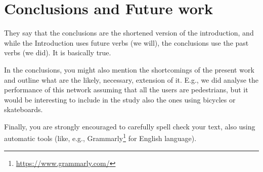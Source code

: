 
\chapter{Conclusions and Future work}

They say that the conclusions are the shortened version of the introduction, and while the Introduction uses future verbs (we will), the conclusions use the past verbs (we did). It is basically true.

In the conclusions, you might also mention the shortcomings of the present work and outline what are the likely, necessary, extension of it.
E.g., we did analyse the performance of this network assuming that all the users are pedestrians, but it would be interesting to include in the study also the ones using bicycles or skateboards.

Finally, you are strongly encouraged to carefully spell check your text, also using automatic tools (like, e.g., Grammarly\footnote{\url{https://www.grammarly.com/}} for English language).
